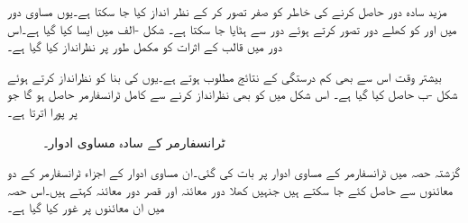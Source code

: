 مزید سادہ دور حاصل کرنے کی خاطر  کو صفر تصور کر کے  نظر انداز کیا جا  سکتا ہے۔یوں مساوی دور میں  اور  کو کھلے دور تصور کرتے ہوئے  دور سے  ہٹایا جا سکتا ہے۔ شکل -الف  میں ایسا کیا گیا ہے۔اس دور میں قالب کے اثرات کو مکمل طور پر نظرانداز کیا گیا ہے۔

بیشتر وقت  اس سے بھی کم درستگی کے نتائج مطلوب ہوتے ہے۔یوں  کی بنا   کو  نظرانداز کرتے ہوئے  شکل -ب حاصل کیا گیا ہے۔ اس شکل میں  کو بھی نظرانداز کرنے سے کامل ٹرانسفارمر حاصل ہو گا جو   پر پورا اترتا ہے۔


\begin{figure}
\centering
\begin{subfigure}{0.6\textwidth}
\centering
{}
\caption{}
\end{subfigure}%
\begin{subfigure}{0.4\textwidth}
\centering
{}
\caption{}
\end{subfigure}
\caption{ٹرانسفارمر کے سادہ مساوی ادوار۔}
\label{شکل_ٹرانسفارمر_سادہ_ماڈل}
\end{figure}
گزشتہ حصہ میں  ٹرانسفارمر کے مساوی ادوار پر بات کی گئی۔ان مساوی ادوار  کے اجزاء ٹرانسفارمر کے دو معائنوں سے حاصل کئے جا سکتے ہیں جنہیں  کھلا دور معائنہ اور قصر دور معائنہ کہتے ہیں۔اس حصہ میں ان معائنوں پر غور کیا گیا ہے۔

